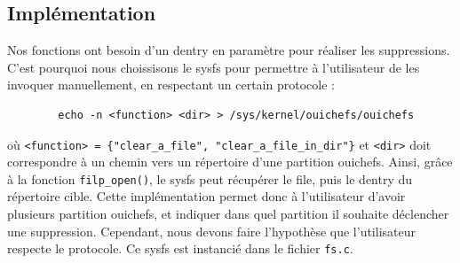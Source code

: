 \documentclass{article}
\begin{document}
	\subsection{Implémentation}
	Nos fonctions ont besoin d'un dentry en paramètre pour réaliser les suppressions. C'est pourquoi nous choissisons le sysfs pour permettre à l'utilisateur de les invoquer manuellement, en respectant un certain protocole :
	\begin{lstlisting}
    	echo -n <function> <dir> > /sys/kernel/ouichefs/ouichefs
	\end{lstlisting}
    où \verb|<function> = {"clear_a_file", "clear_a_file_in_dir"}| et \verb|<dir>| doit correspondre à un chemin vers un répertoire d'une partition ouichefs. Ainsi, grâce à la fonction \verb|filp_open()|, le sysfs peut récupérer le file, puis le dentry du répertoire cible. Cette implémentation permet donc à l'utilisateur d'avoir plusieurs partition ouichefs, et indiquer dans quel partition il souhaite déclencher une suppression. Cependant, nous devons faire l'hypothèse que l'utilisateur respecte le protocole.
    Ce sysfs est instancié dans le fichier \verb|fs.c|.
\end{document}
